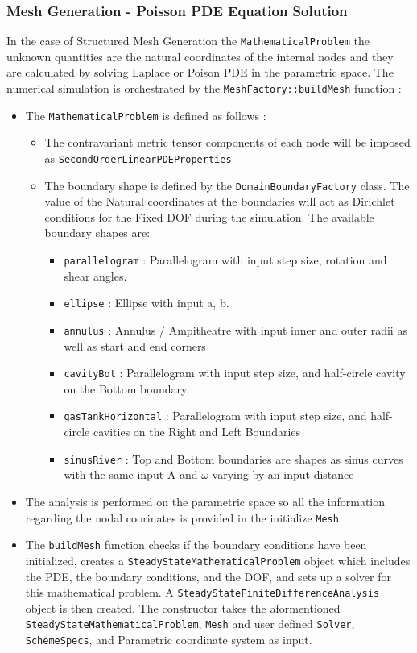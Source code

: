 \documentclass{article}
\begin{document}
	\subsubsection{Mesh Generation - Poisson PDE Equation Solution}
	
	 In the case of Structured Mesh Generation the \texttt{MathematicalProblem} the unknown quantities are the natural coordinates of the internal nodes and they are calculated by solving Laplace or Poison PDE in the parametric space. The numerical simulation is orchestrated by the \texttt{MeshFactory::buildMesh} function : 
 	\begin{itemize}
 		\item The \texttt{MathematicalProblem} is defined as follows :
 			\begin{itemize}
 				\item The contravariant metric tensor components of each node will be imposed as \newline \texttt{SecondOrderLinearPDEProperties}
 				\item The boundary shape is defined by the \texttt{DomainBoundaryFactory} class. The value of the Natural coordinates at the boundaries will act as Dirichlet conditions for the Fixed DOF during the simulation. The available boundary shapes are: 
 			\begin{itemize}
 				\item \texttt{parallelogram} : Parallelogram with input step size, rotation and shear angles.
 				\item \texttt{ellipse} : Ellipse with input a, b.
 				\item \texttt{annulus} : Annulus / Ampitheatre with input inner and outer radii as well as start and end corners
 				\item \texttt{cavityBot} : Parallelogram with input step size, and half-circle cavity on the Bottom boundary.
 				\item \texttt{gasTankHorizontal} : Parallelogram with input step size, and half-circle cavities on the Right and Left Boundaries
 				\item \texttt{sinusRiver} : Top and Bottom boundaries are shapes as sinus curves with the same input A and $\omega$ varying 	by an input distance
 			\end{itemize}
 	\end{itemize}	
 			\item The analysis is performed on the parametric space so all the information regarding the nodal coorinates is provided in the initialize \texttt{Mesh}
 			
 			\item The \texttt{buildMesh} function checks if the boundary conditions have been initialized, creates a \texttt{SteadyStateMathematicalProblem} object which includes the PDE, the boundary conditions, and the DOF, and sets up a solver for this mathematical problem. \newline A \texttt{SteadyStateFiniteDifferenceAnalysis} object is then created. The constructor takes the aformentioned \texttt{SteadyStateMathematicalProblem}, \texttt{Mesh} and user defined \texttt{Solver}, \texttt{SchemeSpecs}, and Parametric coordinate system as input.
 		\end{itemize}
 	
\end{document}
